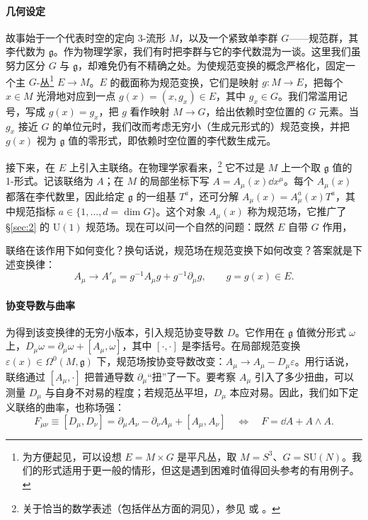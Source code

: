 \paragraph{几何设定}
故事始于一个代表时空的定向 3-流形 $M$，以及一个紧致单李群 $G$——规范群，其李代数为 $\mathfrak{g}$。作为物理学家，我们有时把李群与它的李代数混为一谈。这里我们虽努力区分 $G$ 与 $\mathfrak{g}$，却难免仍有不精确之处。为使规范变换的概念严格化，固定一个主 $G$-丛\footnote{为方便起见，可以设想 $E=M\times G$ 是平凡丛，取 $M=S^3$、$G=\mathrm{SU}(N)$。我们的形式适用于更一般的情形，但这是遇到困难时值得回头参考的有用例子。} $E\to M$。$E$ 的截面称为规范变换，它们是映射 $g\colon M\to E$，把每个 $x\in M$ 光滑地对应到一点 $g(x)=(x,g_x)\in E$，其中 $g_x\in G$。我们常滥用记号，写成 $g(x)=g_x$，把 $g$ 看作映射 $M\to G$，给出依赖时空位置的 $G$ 元素。当 $g_x$ 接近 $G$ 的单位元时，我们改而考虑无穷小（生成元形式的）规范变换，并把 $g(x)$ 视为 $\mathfrak{g}$ 值的零形式，即依赖时空位置的李代数生成元。

接下来，在 $E$ 上引入主联络。在物理学家看来，\footnote{关于恰当的数学表述（包括伴丛方面的洞见），参见 \cite{steenrod1951} 或 \cite{nakahara}。} 它不过是 $M$ 上一个取 $\mathfrak{g}$ 值的 1-形式。记该联络为 $A$；在 $M$ 的局部坐标下写 $A=A_\mu(x)\dd x^\mu$。每个 $A_\mu(x)$ 都落在李代数里，因此给定 $\mathfrak{g}$ 的一组基 $T^a$，还可分解 $A_\mu(x)=A^a_\mu(x)T^a$，其中规范指标 $a\in\{1,\dots,d=\dim G\}$。这个对象 $A_\mu(x)$ 称为规范场，它推广了 \S\ref{sec:2} 的 $\mathrm{U}(1)$ 规范场。现在可以问一个自然的问题：既然 $E$ 自带 $G$ 作用，

联络在该作用下如何变化？换句话说，规范场在规范变换下如何改变？答案就是下述变换律：
\begin{equation}\tag{3.1}\label{eq:3.1}
  A_\mu \longrightarrow A'_\mu = g^{-1}A_\mu g + g^{-1}\partial_\mu g,
  \qquad g = g(x)\in E.
\end{equation}

\paragraph{协变导数与曲率}
为得到该变换律的无穷小版本，引入规范协变导数 $D$。它作用在 $\mathfrak{g}$ 值微分形式 $\omega$ 上，$D_\mu\omega=\partial_\mu\omega+[A_\mu,\omega]$，其中 $[\cdot,\cdot]$ 是李括号。在局部规范变换 $\varepsilon(x)\in\Omega^0(M,\mathfrak{g})$ 下，规范场按协变导数改变：$A_\mu\to A_\mu-D_\mu\varepsilon$。用行话说，联络通过 $[A_\mu,\cdot]$ 把普通导数 $\partial_\mu$“扭”了一下。要考察 $A_\mu$ 引入了多少扭曲，可以测量 $D_\mu$ 与自身不对易的程度；若规范丛平坦，$D_\mu$ 本应对易。因此，我们如下定义联络的曲率，也称场强：
\begin{equation}\tag{3.2}\label{eq:3.2}
  F_{\mu\nu} \equiv [D_\mu, D_\nu] = \partial_\mu A_\nu - \partial_\nu A_\mu + [A_\mu, A_\nu]
  \quad\Longleftrightarrow\quad F = \dd A + A\wedge A.
\end{equation}

